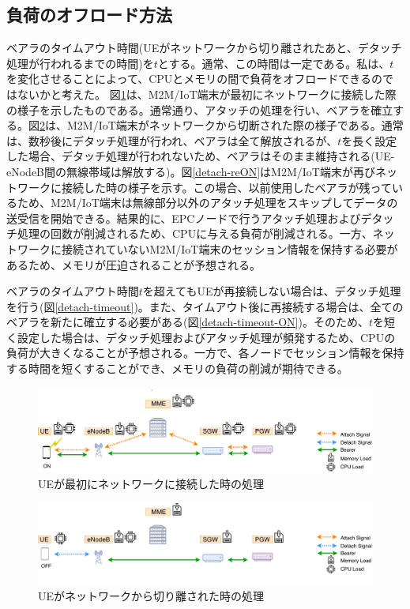 \documentclass[a4j]{ujarticle}
\begin{document}
\subsection{負荷のオフロード方法}
\label{sec:des}
ベアラのタイムアウト時間(UEがネットワークから切り離されたあと、デタッチ処理が行われるまでの時間)を$t$とする。通常、この時間は一定である。私は、$t$を変化させることによって、CPUとメモリの間で負荷をオフロードできるのではないかと考えた。
図\ref{detach-ON}は、M2M/IoT端末が最初にネットワークに接続した際の様子を示したものである。通常通り、アタッチの処理を行い、ベアラを確立する。図\ref{detach-OFF}は、M2M/IoT端末がネットワークから切断された際の様子である。通常は、数秒後にデタッチ処理が行われ、ベアラは全て解放されるが、$t$を長く設定した場合、デタッチ処理が行われないため、ベアラはそのまま維持される(UE-eNodeB間の無線帯域は解放する)。図\ref{detach-reON}はM2M/IoT端末が再びネットワークに接続した時の様子を示す。この場合、以前使用したベアラが残っているため、M2M/IoT端末は無線部分以外のアタッチ処理をスキップしてデータの送受信を開始できる。結果的に、EPCノードで行うアタッチ処理およびデタッチ処理の回数が削減されるため、CPUに与える負荷が削減される。一方、ネットワークに接続されていないM2M/IoT端末のセッション情報を保持する必要があるため、メモリが圧迫されることが予想される。

ベアラのタイムアウト時間$t$を超えてもUEが再接続しない場合は、デタッチ処理を行う(図\ref{detach-timeout})。また、タイムアウト後に再接続する場合は、全てのベアラを新たに確立する必要がある(図\ref{detach-timeout-ON})。そのため、$t$を短く設定した場合は、デタッチ処理およびアタッチ処理が頻発するため、CPUの負荷が大きくなることが予想される。一方で、各ノードでセッション情報を保持する時間を短くすることができ、メモリの負荷の削減が期待できる。



\begin{figure}[htbp]
	\centering
	\includegraphics[width=0.7\hsize]{detach-ON.pdf}
  \caption{UEが最初にネットワークに接続した時の処理}
	\label{detach-ON}
\end{figure}

\begin{figure}[htbp]
	\centering
	\includegraphics[width=0.7\hsize]{detach-OFF.pdf}
  \caption{UEがネットワークから切り離された時の処理}
	\label{detach-OFF}
\end{figure}
\end{document}
